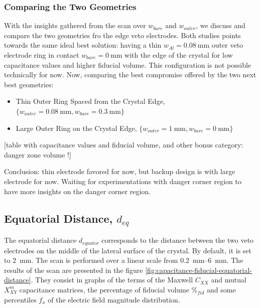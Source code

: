 \subsubsection{Comparing the Two Geometries}

With the insights gathered from the scan over $w_{bare}$ and $w_{outer}$, we discuss and compare the two geometries fro the edge veto electrodes. Both studies points towards the same ideal best solution: having a thin $w_{Al} = \SI{0.08}{\mm}$ outer veto electrode ring in contact $w_{bare}=\SI{0}{\mm}$ with the edge of the crystal for low capacitance values and higher fiducial volume. This configuration is not possible technically for now. Now, comparing the best compromise offered by the two next best geometries:
\begin{itemize}
	\item Thin Outer Ring Spaced from the Crystal Edge, $\{ w_{outer} = \SI{0.08}{\mm}, w_{bare} = \SI{0.3}{\mm} \}$
	\item Large Outer Ring on the Crystal Edge, $\{ w_{outer} = \SI{1}{\mm}, w_{bare} = \SI{0}{\mm} \}$
\end{itemize}

{\color{red} [table with capacitance values and fiducial volume, and other bonus category: danger zone volume !]}

Conclusion: thin electrode favored for now, but backup design is with large electrode for now.
Waiting for experimentations with danger corner region to have more insights on the danger corner region.


\subsection{Equatorial Distance, $d_{eq}$}
\label{par:equatorial-distance}

The equatorial distance $d_{equator}$ corresponds to the distance between the two veto electrodes on the middle of the lateral surface of the crystal. By default, it is set to \SI{2}{\mm}. The scan is performed over a linear scale from \SIrange{0.2}{6}{\mm}. The results of the scan are presented in the figure \ref{fig:capacitance-fiducial-equatorial-distance}. They consist in graphs of the terms of the Maxwell $C_{XX}$ and mutual $X_{XY}^m$ capacitance matrices, the percentage of fiducial volume $\%_{fid}$ and some percentiles $f_x$ of the electric field magnitude distribution. 

